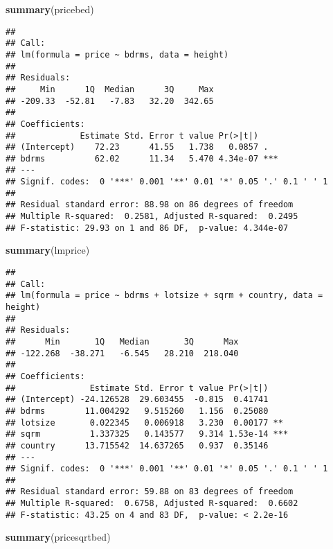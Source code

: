 \documentclass[11pt,]{article}
\newenvironment{Shaded}{\begin{snugshade}}{\end{snugshade}}
\newcommand{\KeywordTok}[1]{\textcolor[rgb]{0.13,0.29,0.53}{\textbf{#1}}}
\newcommand{\NormalTok}[1]{#1}
\begin{document}
\begin{Shaded}
\begin{Highlighting}[]
\KeywordTok{summary}\NormalTok{(pricebed) }
\end{Highlighting}
\end{Shaded}

\begin{verbatim}
## 
## Call:
## lm(formula = price ~ bdrms, data = height)
## 
## Residuals:
##     Min      1Q  Median      3Q     Max 
## -209.33  -52.81   -7.83   32.20  342.65 
## 
## Coefficients:
##             Estimate Std. Error t value Pr(>|t|)    
## (Intercept)    72.23      41.55   1.738   0.0857 .  
## bdrms          62.02      11.34   5.470 4.34e-07 ***
## ---
## Signif. codes:  0 '***' 0.001 '**' 0.01 '*' 0.05 '.' 0.1 ' ' 1
## 
## Residual standard error: 88.98 on 86 degrees of freedom
## Multiple R-squared:  0.2581, Adjusted R-squared:  0.2495 
## F-statistic: 29.93 on 1 and 86 DF,  p-value: 4.344e-07
\end{verbatim}

\begin{Shaded}
\begin{Highlighting}[]
\KeywordTok{summary}\NormalTok{(lmprice)}
\end{Highlighting}
\end{Shaded}

\begin{verbatim}
## 
## Call:
## lm(formula = price ~ bdrms + lotsize + sqrm + country, data = height)
## 
## Residuals:
##      Min       1Q   Median       3Q      Max 
## -122.268  -38.271   -6.545   28.210  218.040 
## 
## Coefficients:
##               Estimate Std. Error t value Pr(>|t|)    
## (Intercept) -24.126528  29.603455  -0.815  0.41741    
## bdrms        11.004292   9.515260   1.156  0.25080    
## lotsize       0.022345   0.006918   3.230  0.00177 ** 
## sqrm          1.337325   0.143577   9.314 1.53e-14 ***
## country      13.715542  14.637265   0.937  0.35146    
## ---
## Signif. codes:  0 '***' 0.001 '**' 0.01 '*' 0.05 '.' 0.1 ' ' 1
## 
## Residual standard error: 59.88 on 83 degrees of freedom
## Multiple R-squared:  0.6758, Adjusted R-squared:  0.6602 
## F-statistic: 43.25 on 4 and 83 DF,  p-value: < 2.2e-16
\end{verbatim}

\begin{Shaded}
\begin{Highlighting}[]
\KeywordTok{summary}\NormalTok{(pricesqrtbed)}
\end{Highlighting}
\end{Shaded}
\end{document}
